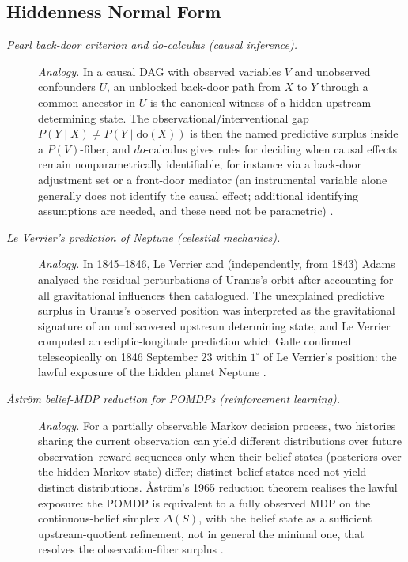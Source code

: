 \subsection*{ Hiddenness Normal Form}
\begingroup\small
\begin{description}
\item[\emph{Pearl back-door criterion and \(do\)-calculus (causal
inference).}] \textit{Analogy.}
In a causal DAG with observed variables \(V\) and unobserved
confounders \(U\), an unblocked back-door path from \(X\) to \(Y\)
through a common ancestor in \(U\) is the canonical witness of a
hidden upstream determining state.  The observational/interventional
gap \(P(Y\mid X)\ne P(Y\mid \mathrm{do}(X))\) is then the named
predictive surplus inside a \(P(V)\)-fiber, and \(do\)-calculus
gives rules for deciding when causal effects remain nonparametrically identifiable, for instance via a back-door adjustment set or a front-door mediator (an instrumental variable alone generally does not identify the causal effect; additional identifying assumptions are needed, and these need not be parametric)
\citep{Pearl1995CausalDiagrams}.

\item[\emph{Le Verrier's prediction of Neptune (celestial
mechanics).}] \textit{Analogy.}
In 1845--1846, Le Verrier and (independently, from 1843) Adams analysed the residual
perturbations of Uranus's orbit after accounting for all
gravitational influences then catalogued.  The unexplained
predictive surplus in Uranus's observed position was interpreted as
the gravitational signature of an undiscovered upstream determining
state, and Le Verrier computed an ecliptic-longitude prediction
which Galle confirmed telescopically on 1846 September 23 within
\(1^\circ\) of Le Verrier's position: the lawful exposure of the
hidden planet Neptune
\citep{LeVerrier1846RecherchesUranus}.

\item[\emph{{\AA}str{\"o}m belief-MDP reduction for {POMDPs}
(reinforcement learning).}] \textit{Analogy.}
For a partially observable Markov decision process, two histories
sharing the current observation can yield different distributions
over future observation--reward sequences only when their belief
states (posteriors over the hidden Markov state) differ; distinct
belief states need not yield distinct distributions.
{\AA}str{\"o}m's 1965 reduction theorem realises the lawful exposure:
the POMDP is equivalent to a fully observed MDP on the
continuous-belief simplex \(\Delta(S)\), with the belief state as a sufficient upstream-quotient refinement,
not in general the minimal one, that resolves the
observation-fiber surplus
\citep{Astrom1965OptimalControlIncomplete}.


\end{description}
